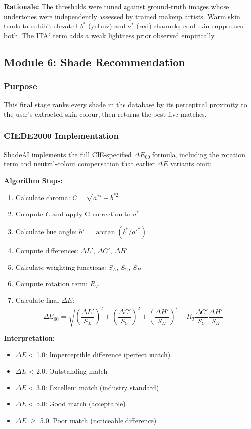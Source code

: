 \textbf{Rationale:} The thresholds were tuned against ground-truth images whose undertones were independently assessed by trained makeup artists. Warm skin tends to exhibit elevated $b^*$ (yellow) and $a^*$ (red) channels; cool skin suppresses both. The ITA° term adds a weak lightness prior observed empirically.

\subsection{Module 6: Shade Recommendation}

\subsubsection{Purpose}
This final stage ranks every shade in the database by its perceptual proximity to the user's extracted skin colour, then returns the best five matches.

\subsubsection{CIEDE2000 Implementation}

ShadeAI implements the full CIE-specified $\Delta E_{00}$ formula, including the rotation term and neutral-colour compensation that earlier $\Delta E$ variants omit:

\textbf{Algorithm Steps:}
\begin{enumerate}
    \item Calculate chroma: $C = \sqrt{a^{*2} + b^{*2}}$
    \item Compute $\bar{C}$ and apply G correction to $a^*$
    \item Calculate hue angle: $h' = \arctan(b^*/a'^*)$
    \item Compute differences: $\Delta L'$, $\Delta C'$, $\Delta H'$
    \item Calculate weighting functions: $S_L$, $S_C$, $S_H$
    \item Compute rotation term: $R_T$
    \item Calculate final $\Delta E$:
    \begin{equation}
        \Delta E_{00} = \sqrt{\left(\frac{\Delta L'}{S_L}\right)^2 + \left(\frac{\Delta C'}{S_C}\right)^2 + \left(\frac{\Delta H'}{S_H}\right)^2 + R_T \frac{\Delta C'}{S_C} \frac{\Delta H'}{S_H}}
    \end{equation}
\end{enumerate}

\textbf{Interpretation:}
\begin{itemize}
    \item $\Delta E$ < 1.0: Imperceptible difference (perfect match)
    \item $\Delta E$ < 2.0: Outstanding match
    \item $\Delta E$ < 3.0: Excellent match (industry standard)
    \item $\Delta E$ < 5.0: Good match (acceptable)
    \item $\Delta E$ $\geq$ 5.0: Poor match (noticeable difference)
\end{itemize}

